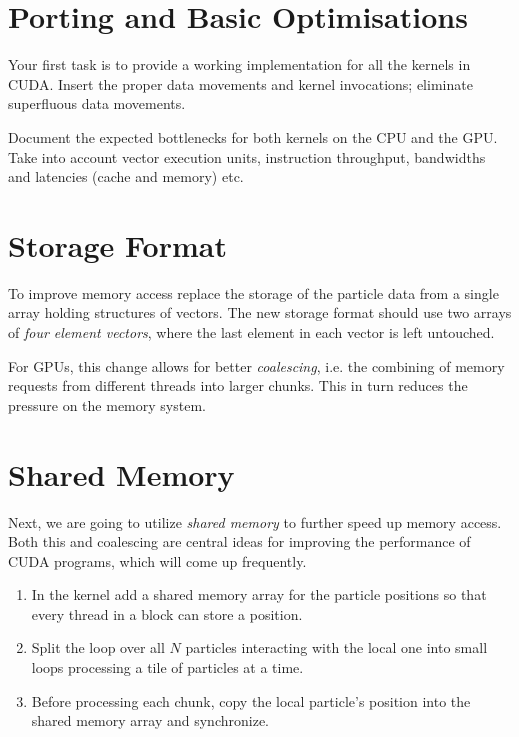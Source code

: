 \documentclass{tufte-handout}
\begin{document}
\section{Porting and Basic Optimisations}
Your first task is to provide a working implementation for all the
kernels in CUDA. Insert the proper data
movements and kernel invocations; eliminate superfluous data
movements.

Document the expected bottlenecks for both kernels on the CPU and the GPU.
Take into account vector execution units, instruction throughput, bandwidths
and latencies (cache and memory) etc.

\section{Storage Format}
To improve memory access replace the storage of the particle data
from a single array holding structures of vectors. The new storage
format should use two arrays of \emph{four element vectors}, where
the last element in each vector is left untouched.

For GPUs, this change allows for better \emph{coalescing}, i.e. the
combining of memory requests from different threads into larger chunks.
This in turn reduces the pressure on the memory system.

\section{Shared Memory}
Next, we are going to utilize \emph{shared memory}   to further speed up memory
access. Both this and coalescing are central ideas for improving the
performance of CUDA programs, which will come up frequently.

\begin{enumerate}
\item In the kernel add a shared memory array for the
  particle positions so that every thread in a block can store a
  position.
\item Split the loop over all $N$ particles interacting with the
  local one into small loops processing a tile of particles at a time.
\item Before processing each chunk, copy the local particle's
  position into the shared memory array and synchronize.
\end{enumerate}
\end{document}
